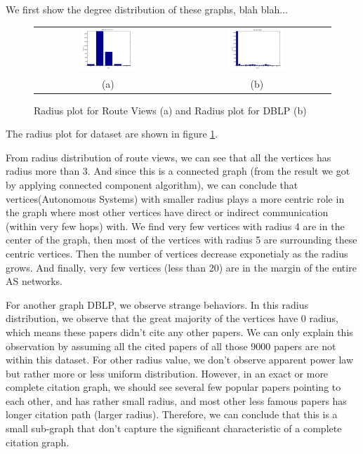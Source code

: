 We first show the degree distribution of these graphs, blah blah...

\begin{figure}[htbf]
\begin{center}
\begin{tabular}{cc}
     \includegraphics[width=0.4\textwidth]{FIG/route_radius.png} &
     \includegraphics[width=0.4\textwidth]{FIG/dblp_radius.png} \\
    (a) & (b) 
\end{tabular}
\caption{Radius plot for Route Views (a) and Radius plot for DBLP (b)}
\label{fig:radius_plot}
\end{center}
\end{figure}

The radius plot for dataset are shown in figure \ref{fig:radius_plot}. 

From radius distribution of route views, we can see that all the vertices has radius more than 3. And since this is a connected graph (from the result we got by applying connected component algorithm), we can conclude that vertices(Autonomous Systems) with smaller radius plays a more centric role in the graph where most other vertices have direct or indirect communication (within very few hops) with. We find very few vertices with radius 4 are in the center of the graph, then most of the vertices with radius 5 are surrounding these centric vertices. Then the number of vertices decrease exponetialy as the radius grows. And finally, very few vertices (less than 20) are in the margin of the entire AS networks.  

For another graph DBLP, we observe strange behaviors. In this radius distribution, we observe that the great majority of the vertices have 0 radius, which means these papers didn't cite any other papers. We can only explain this observation by assuming all the cited papers of all those 9000 papers are not within this dataset. For other radius value, we don't observe apparent power law but rather more or less uniform distribution. However, in an exact or more complete citation graph, we should see several few popular papers pointing to each other, and has rather small radius, and most other less famous papers has longer citation path (larger radius). Therefore, we can conclude that this is a small sub-graph that don't capture the significant characteristic of a complete citation graph.



